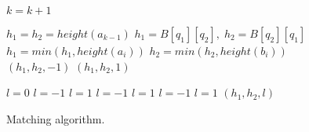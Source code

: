 \documentclass[AMA,STIX1COL]{WileyNJD-v2}
\begin{document}
\begin{figure*}
\begin{multicols}{2}
\begin{algorithm}[H]
{        \BlankLine
         {
             {
              $k = k + 1$
            }
        }

        \BlankLine
         {
            $h_1 = h_2 = height (a_{k-1})$
        }  {
            $h_1 = B [q_1] [q_2], \; h_2 = B [q_2] [q_1]$
        }
         {
            $h_1 = min (h_1, height (a_i))$
        }
         {
            $h_2 = min (h_2, height (b_i))$
        }
         {\Return $(h_1, h_2, -1)$}
         {\Return $(h_1, h_2, 1)$}

        \BlankLine
         {
             { $l = 0$ }
             { $l = -1$ }
             { $l = 1$ }
             { $l = -1$ }
             { $l = 1$ }
             { $l = -1$ }
             { $l = 1$ }
        } 
        \Return $(h_1, h_2, l)$
    }
    \end{algorithm}

\end{multicols}
\begin{center}
\caption{Matching algorithm.}
\end{center}
\end{figure*}
\end{document}
